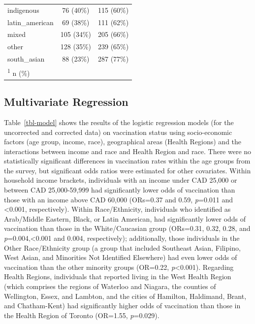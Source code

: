 \documentclass[
  letterpaper,
  DIV=11,
  numbers=noendperiod]{scrartcl}
\begin{document}
\begin{table}
\begin{tabular}{lcc}
\hspace{1em}indigenous & 76 (40\%) & 115 (60\%)\\
\hspace{1em}latin\_american & 69 (38\%) & 111 (62\%)\\
\hspace{1em}mixed & 105 (34\%) & 205 (66\%)\\
\hspace{1em}other & 128 (35\%) & 239 (65\%)\\
\hspace{1em}south\_asian & 88 (23\%) & 287 (77\%)\\
\bottomrule
\multicolumn{3}{l}{\rule{0pt}{1em}\textsuperscript{1} n (\%)}\\
\end{tabular}
\endgroup{}
\end{table}

\hypertarget{multivariate-regression}{%
\subsection{Multivariate Regression}\label{multivariate-regression}}

Table~\ref{tbl-model} shows the results of the logistic regression
models (for the uncorrected and corrected data) on vaccination status
using socio-economic factors (age group, income, race), geographical
areas (Health Regions) and the interactions between income and race and
Health Region and race. There were no statistically significant
differences in vaccination rates within the age groups from the survey,
but significant odds ratios were estimated for other covariates. Within
household income brackets, individuals with an income under CAD 25,000
or between CAD 25,000-59,999 had significantly lower odds of vaccination
than those with an income above CAD 60,000 (ORs=0.37 and 0.59,
\emph{p}=0.011 and \textless0.001, respectively). Within Race/Ethnicity,
individuals who identified as Arab/Middle Eastern, Black, or Latin
American, had significantly lower odds of vaccination than those in the
White/Caucasian group (ORs=0.31, 0.32, 0.28, and
\emph{p}=0.004,\textless0.001 and 0.004, respectively); additionally,
those individuals in the Other Race/Ethnicity group (a group that
included Southeast Asian, Filipino, West Asian, and Minorities Not
Identified Elsewhere) had even lower odds of vaccination than the other
minority groups (OR=0.22, \emph{p}\textless0.001). Regarding Health
Regions, individuals that reported living in the West Health Region
(which comprises the regions of Waterloo and Niagara, the counties of
Wellington, Essex, and Lambton, and the cities of Hamilton, Haldimand,
Brant, and Chatham-Kent) had significantly higher odds of vaccination
than those in the Health Region of Toronto (OR=1.55, \emph{p}=0.029).
\end{document}
